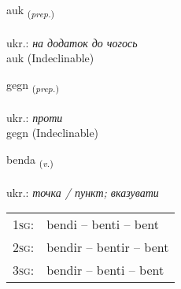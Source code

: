 \documentclass[frontgrid, backgrid]{flacards}\usepackage[]{graphicx}\usepackage[]{xcolor}
\begin{document}
\renewcommand{\blhead}{\vskip5pt {\small\bfseries\footnotesize Forsetning | прийменник }}
\renewcommand{\bcfoot}{\vskip5pt \hspace{2pt}{\small\bfseries\footnotesize 1K}}


{auk \small{\textsubscript{(\textit{prep.})}} \\[1ex]
\textphonetic{[œiːk]} \\
ukr.: \emph{на додаток до чогось} \\  [2ex]
auk (Indeclinable)}


\renewcommand{\flhead}{\vskip5pt \fboxsep=0pt {\small\bfseries\footnotesize Forsetning | прийменник}}
\renewcommand{\fcfoot}{\vskip5pt \fboxsep=0pt \hspace{2pt}{\small\bfseries\footnotesize 1K}}

\renewcommand{\blhead}{\vskip5pt {\small\bfseries\footnotesize Forsetning | прийменник }}
\renewcommand{\bcfoot}{\vskip5pt \hspace{2pt}{\small\bfseries\footnotesize 1K}}


{gegn \small{\textsubscript{(\textit{prep.})}} \\[1ex]
\textphonetic{[cɛkn̥]} \\
ukr.: \emph{проти} \\  [2ex]
gegn (Indeclinable)}

\renewcommand{\flhead}{\vskip5pt \fboxsep=0pt {\small\bfseries\footnotesize Sagnorð | дієслово}}
\renewcommand{\fcfoot}{\vskip5pt \fboxsep=0pt \hspace{2pt}{\small\bfseries\footnotesize 1K}}

\renewcommand{\blhead}{\vskip5pt {\small\bfseries\footnotesize Sagnorð | дієслово }}
\renewcommand{\bcfoot}{\vskip5pt \hspace{2pt}{\small\bfseries\footnotesize 1K}}


{benda \small{\textsubscript{(\textit{v.})}} \\[1ex] %
\textphonetic{[pɛnta]} \\
ukr.: \emph{точка / пункт; вказувати} \\  [2ex]
\renewcommand*{\arraystretch}{0.8}
\begin{tabular}{p{1cm}l}
\textsc{1sg}: & bendi -- benti -- bent \\ 
\textsc{2sg}: & bendir -- bentir -- bent \\ 
\textsc{3sg}: & bendir -- benti -- bent \\ 
\end{tabular}
}
\end{document}
